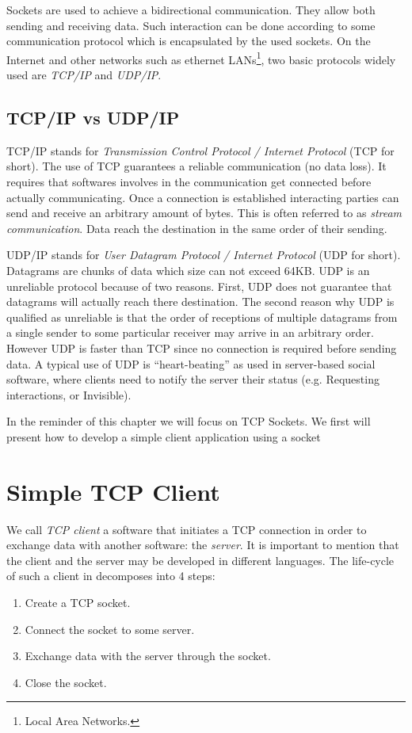 \documentclass[a4paper,10pt,twoside]{book}
\begin{document}
Sockets are used to achieve a bidirectional communication.
They allow both sending and receiving data.
Such interaction can be done according to some communication protocol which is encapsulated by the used sockets.
On the Internet and other networks such as ethernet LANs\footnote{Local Area Networks.}, two basic protocols widely used are {\em TCP/IP} and {\em UDP/IP}.

\subsection{TCP/IP vs UDP/IP}
TCP/IP stands for {\em Transmission Control Protocol / Internet Protocol} (TCP for short).
The use of TCP guarantees a reliable communication (no data loss).
It requires that softwares involves in the communication get connected before actually communicating. 
Once a connection is established interacting parties can send and receive an arbitrary amount of bytes.
This is often referred to as {\em stream communication}.
Data reach the destination in the same order of their sending.

UDP/IP stands for {\em User Datagram Protocol / Internet Protocol} (UDP for short).
Datagrams are chunks of data which size can not exceed 64KB.
UDP is an unreliable protocol because of two reasons.
First, UDP does not guarantee that  datagrams will actually reach there destination.
The second reason why UDP is qualified as unreliable is that the order of receptions of multiple datagrams from a single sender to some particular receiver may arrive in an arbitrary order.
However UDP is faster than TCP since no connection is required before sending data.
A typical use of UDP is  ``heart-beating'' as used in server-based social software, where clients need to notify the server their status (e.g. Requesting interactions, or Invisible).

In the reminder of this chapter we will focus on TCP Sockets.
We first will present how to develop a simple client application using a socket
 
\section{Simple TCP Client}
We call {\em TCP client}  a software that initiates a TCP connection in order to exchange data with another software: the {\em server}.
It is important to mention that the client and the server may be developed in different languages.
The life-cycle of such a client in \pharo decomposes into 4 steps:
\begin{enumerate}
\item Create a TCP socket.
\item Connect the socket to some server.
\item Exchange data with the server through the socket.
\item Close the socket.
\end{enumerate}
\end{document}
